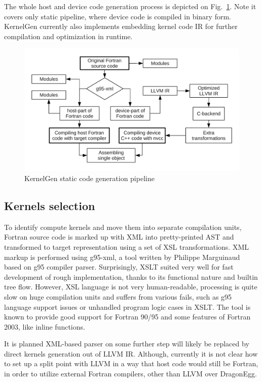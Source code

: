 \documentclass[a4,12pt]{article}
\begin{document}
The whole host and device code generation process is depicted on Fig.~\ref{fig:pipeline}. Note it covers only static pipeline, where device code is compiled in binary form. KernelGen currently also implements embedding kernel code IR for further compilation and optimization in runtime.

\begin{figure}
\centering
\includegraphics[scale=0.5]{figures/pipeline.pdf}
\caption{KernelGen static code generation pipeline}
\label{fig:pipeline}
\end{figure}

\subsection{Kernels selection}

To identify compute kernels and move them into separate compilation units, Fortran source code is marked up with XML into pretty-printed AST and transformed to target representation using a set of XSL transformations. XML markup is performed using g95-xml, a tool written by Philippe Marguinaud based on g95 compiler parser. Surprisingly, XSLT suited very well for fast development of rough implementation, thanks to its functional nature and builtin tree flow. However, XSL language is not very human-readable, processing is quite slow on huge compilation units and suffers from various fails, such as g95 language support issues or unhandled program logic cases in XSLT. The tool is known to provide good support for Fortran 90/95 and some features of Fortran 2003, like inline functions.

It is planned XML-based parser on some further step will likely be replaced by direct kernels generation out of LLVM IR. Although, currently it is not clear how to set up a split point with LLVM in a way that host code would still be Fortran, in order to utilize external Fortran compilers, other than LLVM over DragonEgg.
\end{document}
